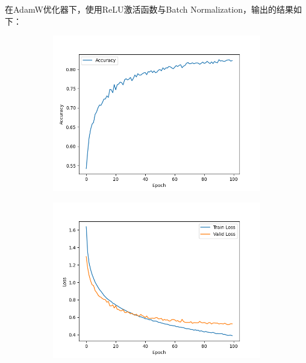 \documentclass[11pt, a4paper]{article}
\begin{document}
\section{}
在AdamW优化器下，使用ReLU激活函数与Batch Normalization，输出的结果如下：
\begin{figure}[H]
    \hfill
    \begin{subfigure}[t]{0.45\linewidth}
        \includegraphics[width=\textwidth]{img/Q3/Acc.png}
    \end{subfigure}
    \hfill
    \begin{subfigure}[t]{0.45\linewidth}
        \includegraphics[width=\textwidth]{img/Q3/Loss.png}
    \end{subfigure}
    \hfill
\end{figure}
\end{document}
